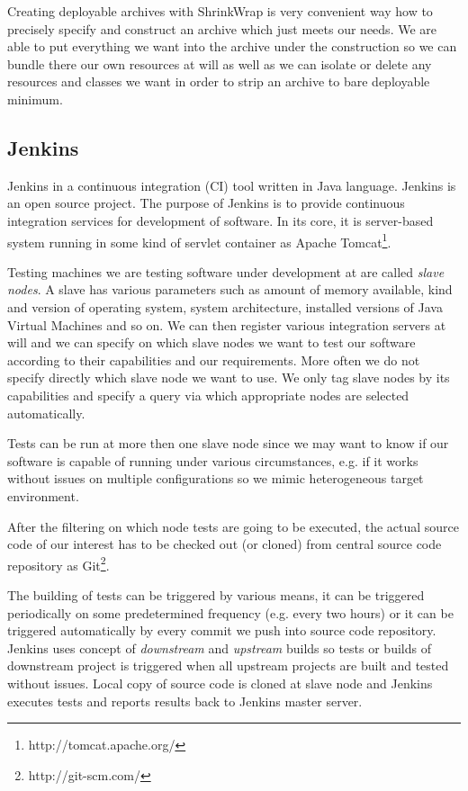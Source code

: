 \documentclass[12pt,final,oneside]{fithesis}
\begin{document}
Creating deployable archives with ShrinkWrap is very convenient way how to precisely specify and construct an archive which just meets our needs. We are able to put everything we want into the archive under the construction so we can bundle there our own resources at will as well as we can isolate or delete any resources and classes we want in order to strip an archive to bare deployable minimum.

		\subsection{Jenkins}

Jenkins in a continuous integration (CI) tool written in Java language. Jenkins is an open source project. The purpose of Jenkins is to provide continuous integration services for development of software. In its core, it is server-based system running in some kind of servlet container as Apache Tomcat\footnote{http://tomcat.apache.org/}.

Testing machines we are testing software under development at are called \textit{slave nodes}. A slave has various parameters such as amount of memory available, kind and version of operating system, system architecture, installed versions of Java Virtual Machines and so on. We can then register various integration servers at will and we can specify on which slave nodes we want to test our software according to their capabilities and our requirements. More often we do not specify directly which slave node we want to use. We only tag slave nodes by its capabilities and specify a query via which appropriate nodes are selected automatically.

Tests can be run at more then one slave node since we may want to know if our software is capable of running under various circumstances, e.g. if it works without issues on multiple configurations so we mimic heterogeneous target environment.

After the filtering on which node tests are going to be executed, the actual source code of our interest has to be checked out (or cloned) from central source code repository as Git\footnote{http://git-scm.com/}.

The building of tests can be triggered by various means, it can be triggered periodically on some predetermined frequency (e.g. every two hours) or it can be triggered automatically by every commit we push into source code repository. Jenkins uses concept of \textit{downstream} and \textit{upstream} builds so tests or builds of downstream project is triggered when all upstream projects are built and tested without issues. Local copy of source code is cloned at slave node and Jenkins executes tests and reports results back to Jenkins master server.
\end{document}
